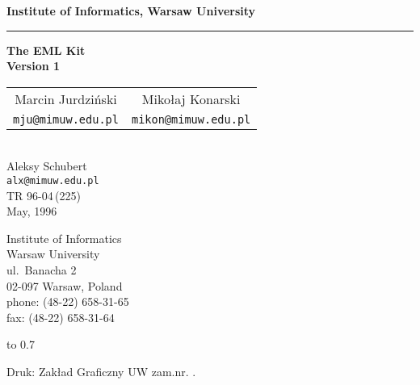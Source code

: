 
\thispagestyle{empty}

\begin{center}
{\large \bf Institute of Informatics, Warsaw University}
\end{center}

\hrule
\hbox{}\vspace{50mm}

\hspace*{3.8cm}\begin{minipage}{10cm}
\begin{center}

{\Large \bf The EML Kit}\\[10pt]
{\Large \bf Version 1}\\[30pt]


\begin{tabular}{cc}

 Marcin Jurdzi\'nski
&
 Miko{\l}aj Konarski

\\
 {\tt mju@mimuw.edu.pl}	
&
 {\tt mikon@mimuw.edu.pl}

\end{tabular}\\[10pt]

  Aleksy Schubert\\
 {\tt alx@mimuw.edu.pl}\\[30pt]

{\sf TR 96-04$\,$(225)}\\
{\sf May, 1996}
\end{center}
\end{minipage}

\vfill

\newpage

\thispagestyle{empty}
\hbox{}\vspace{30mm}



\begin{flushleft}
Institute of Informatics\\
Warsaw University\\
ul.\ Banacha 2\\
02-097 Warsaw, Poland\\
phone: (48-22) 658-31-65\\
fax: (48-22) 658-31-64
\end{flushleft}

\vspace{138mm}

\hbox to 0.7\hsize{\hrulefill}

\begin{flushleft}
{\small Druk: Zak\l ad Graficzny UW zam.nr.\hskip30pt .}
\end{flushleft}
\thispagestyle{empty}

